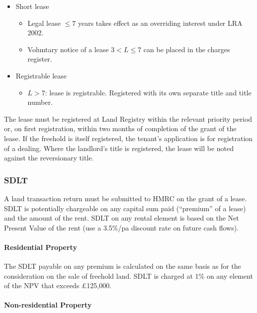 \documentclass[
]{article}
\providecommand{\tightlist}{%
  \setlength{\itemsep}{0pt}\setlength{\parskip}{0pt}}
\begin{document}
\begin{itemize}
\tightlist
\item
  Short lease

  \begin{itemize}
  \tightlist
  \item
    Legal lease \(\leq 7\) years takes effect as an overriding interest
    under LRA 2002.
  \item
    Voluntary notice of a lease \(3 < L \leq 7\) can be placed in the
    charges register.
  \end{itemize}
\item
  Registrable lease

  \begin{itemize}
  \tightlist
  \item
    \(L >7\): lease is registrable. Registered with its own separate
    title and title number.
  \end{itemize}
\end{itemize}

The lease must be registered at Land Registry within the relevant
priority period or, on first registration, within two months of
completion of the grant of the lease. If the freehold is itself
registered, the tenant's application is for registration of a dealing.
Where the landlord's title is registered, the lease will be noted
against the reversionary title.

\hypertarget{sdlt}{%
\subsubsection{SDLT}\label{sdlt}}

A land transaction return must be submitted to HMRC on the grant of a
lease. SDLT is potentially chargeable on any capital sum paid
(``premium'' of a lease) and the amount of the rent. SDLT on any rental
element is based on the Net Present Value of the rent (use a 3.5\%/pa
discount rate on future cash flows).

\hypertarget{residential-property}{%
\paragraph{Residential Property}\label{residential-property}}

The SDLT payable on any premium is calculated on the same basis as for
the consideration on the sale of freehold land. SDLT is charged at 1\%
on any element of the NPV that exceeds £125,000.

\hypertarget{non-residential-property}{%
\paragraph{Non-residential Property}\label{non-residential-property}}
\end{document}
